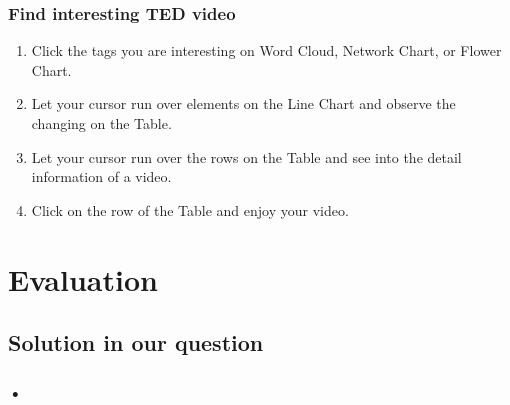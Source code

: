 \documentclass{report}
\numberwithin{figure}{section}
\begin{document}
\subsection{Find interesting TED video}
\begin{enumerate}
\item Click the tags you are interesting on Word Cloud, Network Chart, or Flower Chart.
\item Let your cursor run over elements on the Line Chart and observe the changing on the Table.
\item Let your cursor run over the rows on the Table and see into the detail information of a video.
\item Click on the row of the Table and enjoy your video.
\end{enumerate}

\chapter{Evaluation}
\section{Solution in our question}

\subsection{•}
\end{document}

